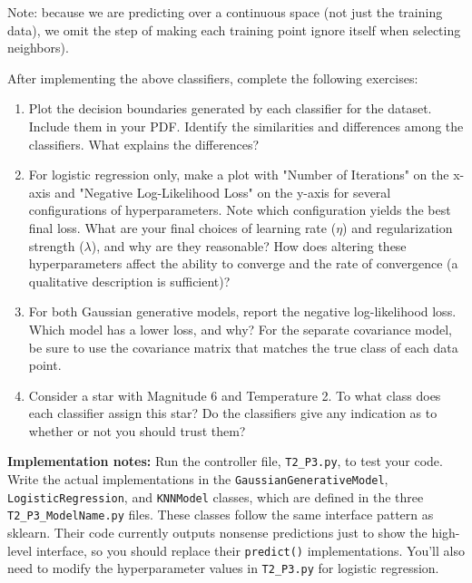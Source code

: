 \documentclass[submit]{harvardml}
\begin{document}
\begin{problem}
\begin{enumerate}[label=\alph*)]
Note: because we are predicting over a continuous space (not just the training data), we omit the step of making each training point ignore itself when selecting neighbors).

\end{enumerate}

After implementing the above classifiers, complete the following exercises:

\begin{enumerate}
    \item Plot the decision boundaries generated by each classifier for the dataset. Include them in your PDF. 
    Identify the similarities and differences among the classifiers. What explains the differences?
    
    \item For logistic regression only, make a plot with
      "Number of Iterations" on the x-axis and "Negative Log-Likelihood Loss" on the y-axis for several
      configurations of hyperparameters. Note which configuration yields
      the best final loss. What are your final choices of learning rate
      ($\eta$) and regularization strength ($\lambda$), and why are they reasonable? How
      does altering these hyperparameters affect the ability to converge and the rate of convergence (a
      qualitative description is sufficient)?

    \item For both Gaussian generative models, report the negative log-likelihood loss. Which model has a lower loss, and why?
      For the separate covariance model, be sure to use
      the covariance matrix that matches the true class of each data
      point.
    
    \item Consider a star with Magnitude 6 and Temperature 2.
      To what class does each classifier assign this star? Do the
      classifiers give any indication as to whether or not you should
  trust them?
\end{enumerate}

\textbf{Implementation notes:} Run the controller file, \texttt{T2\_P3.py},
to test your code. Write the actual implementations in the \texttt{GaussianGenerativeModel},
\texttt{LogisticRegression}, and \texttt{KNNModel} classes, which are defined in the three
\texttt{T2\_P3\_ModelName.py} files. These classes follow the same interface pattern
as sklearn. Their code
currently outputs nonsense predictions just to show the
high-level interface, so you should replace their \texttt{predict()} implementations.
You'll also need to modify the hyperparameter
values in \texttt{T2\_P3.py} for logistic regression.

\end{problem}
\end{document}
